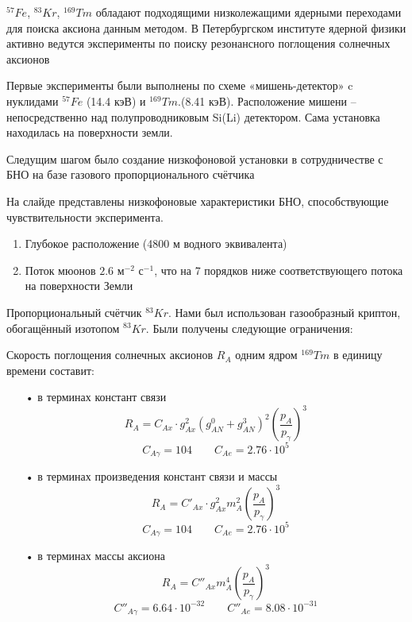 \documentclass[a4paper,article,14pt]{extarticle}
\begin{document}
$^{57}Fe$, $^{83}Kr$, $^{169}Tm$ обладают подходящими низколежащими ядерными переходами для поиска аксиона данным методом. В Петербургском институте ядерной физики активно ведутся эксперименты по поиску резонансного поглощения солнечных аксионов \cite{Derbin2005,Derbin2007,Derbin2009, Derbin2011}

Первые эксперименты были выполнены по схеме «мишень-детектор» c нуклидами $^{57}Fe$ (14.4 кэВ) и $^{169}Tm$.(8.41 кэВ). Расположение мишени -- непосредственно над полупроводниковым Si(Li) детектором. Сама установка находилась на поверхности земли.

Следущим шагом было создание низкофоновой установки в сотрудничестве с БНО на базе газового пропорционального счётчика 

На слайде представлены низкофоновые характеристики БНО, способствующие чувствительности эксперимента.

\begin{enumerate}
    \item Глубокое расположение (4800 м водного эквивалента)
    \item Поток мюонов $2.6 \text{ м}^{-2}\text{ с}^{-1}$, 
    что на 7 порядков ниже соответствующего потока на поверхности Земли
\end{enumerate}

Пропорциональный счётчик $^{83}Kr$. Нами был использован газообразный криптон, обогащённый изотопом $^{83}Kr$. Были получены следующие ограничения:

Скорость поглощения солнечных аксионов $R_A$ одним ядром $^{169}Tm$ в единицу времени составит:
\begin{enumerate}
    \item[•] в терминах констант связи
    \begin{equation}
    \label{RAg1}
        {R_A} = {C_{Ax}} \cdot g_{Ax}^2{\left( {g_{AN}^0 + g_{AN}^3} \right)^2}{\left( {\frac{{{p_A}}}{{{p_\gamma }}}} \right)^3}
    \end{equation}
    \begin{equation}
        C_{A\gamma } = 104 \qquad C_{Ae} = 2.76 \cdot {10^5}
    \end{equation}
    \item[•] в терминах произведения констант связи и массы
    \begin{equation}
    \label{RAg}
        {R_A} = {C'_{Ax}} \cdot g_{Ax}^2 m_A^2{\left( {\frac{{{p_A}}}{{{p_\gamma }}}} \right)^3}
    \end{equation}
    \begin{equation}
        C_{A\gamma } = 104 \qquad C_{Ae} = 2.76 \cdot {10^5}
    \end{equation}
    \item[•] в терминах массы аксиона
    \begin{equation}
    \label{RAm}
   {R_A} = {C''_{Ax}}m_A^4{\left( {\frac{{{p_A}}}{{{p_\gamma }}}} \right)^3}
\end{equation}
\begin{equation}
        C''_{A\gamma } = 6.64 \cdot 10^{-32} \qquad C''_{Ae} = 8.08 \cdot 10^{-31}
    \end{equation}
\end{enumerate}
\end{document}
